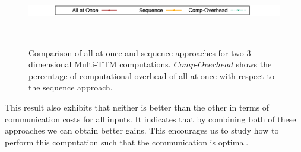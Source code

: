 \documentclass[a4paper,11pt]{article}
\begin{document}
	
	\begin{figure}[htb]
		\begin{center}
			\includegraphics[scale=0.215]{./plots/all-at-once-seq-label.png}
		\end{center}
		\vspace*{-1.05cm}\begin{center}
			$\quad$
			\caption{Comparison of all at once and sequence approaches for two 3-dimensional Multi-TTM computations. $Comp$-$Overhead$ shows the percentage of computational overhead of all at once with respect to the sequence approach.\label{fig:compAllatonceInseq}}
		\end{center}		
	\end{figure}

	This result also exhibits that neither is better than the other in terms of communication costs for all inputs. It indicates that by combining both of these approaches we can obtain better gains. This encourages us to study how to perform this computation such that the communication is optimal. 
	
	
	
\end{document}
